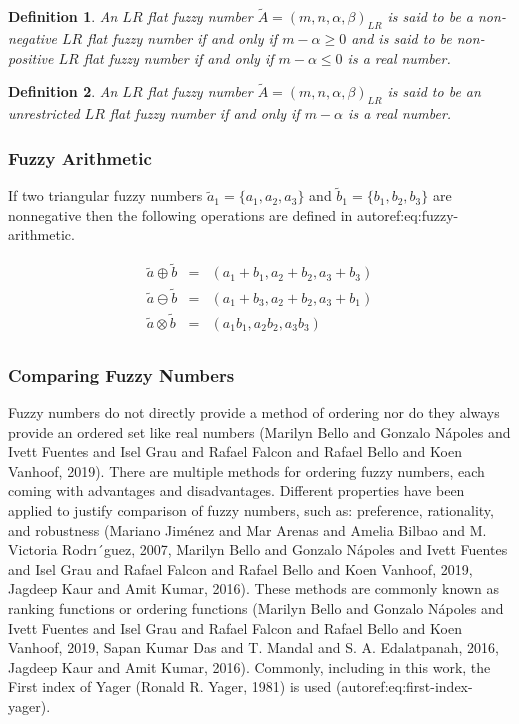 \documentclass[11pt,a4paper,final]{article}
\newtheorem{definition}{Definition}[section]
\begin{document}
\begin{definition}
An \(LR\) flat fuzzy number \(\tilde{A} = (m,n,\alpha,\beta)_{LR}\) is said to be a non-negative \(LR\) flat fuzzy number if and only
if \(m-\alpha \ge 0\) and is said to be non-positive \(LR\) flat fuzzy number if and only if \(m - \alpha \le 0\) is a real number.
\end{definition}

\begin{definition}
An \(LR\) flat fuzzy number \(\tilde{A} = (m,n,\alpha,\beta)_{LR}\) is said to be an unrestricted \(LR\) flat fuzzy number if and only
if \(m - \alpha\) is a real number.
\end{definition}

\subsubsection{Fuzzy Arithmetic}
\label{sec:orga7c5ecd}
If two triangular fuzzy numbers \(\tilde{a}_1 = \{a_1, a_2, a_3\}\) and \(\tilde{b}_1 = \{b_1, b_2, b_3\}\) are nonnegative
then the following operations are defined in autoref:eq:fuzzy-arithmetic.

\begin{equation}
\label{eq:fuzzy-arithmetic}
\begin{array}{lcl}
\tilde{a} \oplus \tilde{b} & = & (a_1 + b_1, a_2 + b_2, a_3 + b_3) \\
\tilde{a} \ominus \tilde{b} & = & (a_1 + b_3, a_2 + b_2, a_3 + b_1) \\
\tilde{a} \otimes \tilde{b} & = & (a_1 b_1, a_2 b_2, a_3 b_3)       \\
\end{array}
\end{equation}

\subsubsection{Comparing Fuzzy Numbers}
\label{sec:org0552a3d}
Fuzzy numbers do not directly provide a method of ordering nor do they always provide an ordered set like real numbers
(Marilyn Bello and Gonzalo N{\'a}poles and Ivett Fuentes and Isel Grau and Rafael Falcon and Rafael Bello and Koen Vanhoof, 2019). There are multiple methods for ordering fuzzy numbers, each coming with advantages and
disadvantages. Different properties have been applied to justify comparison of fuzzy numbers, such as: preference,
rationality, and robustness (Mariano Jim{\'e}nez and Mar Arenas and Amelia Bilbao and M. Victoria Rodrı´guez, 2007, Marilyn Bello and Gonzalo N{\'a}poles and Ivett Fuentes and Isel Grau and Rafael Falcon and Rafael Bello and Koen Vanhoof, 2019, Jagdeep Kaur and Amit Kumar, 2016). These
methods are commonly known as ranking functions or ordering functions
(Marilyn Bello and Gonzalo N{\'a}poles and Ivett Fuentes and Isel Grau and Rafael Falcon and Rafael Bello and Koen Vanhoof, 2019, Sapan Kumar Das and T. Mandal and S. A. Edalatpanah, 2016, Jagdeep Kaur and Amit Kumar, 2016). Commonly, including in this work, the First
index of Yager (Ronald R. Yager, 1981) is used (autoref:eq:first-index-yager).
\end{document}
